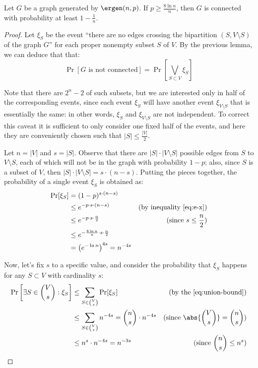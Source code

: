 \begin{theorem}[Connectivity of $G(n,p)$]\label{thm:gnp-connectivity}
    Let $G$ be a graph generated by $\ergen(n, p)$. If $p \geq \frac{8 \ln n}{n}$, then $G$ is connected with probability at least $1 - \frac{1}{n}$. %
\end{theorem}

\begin{proof}
    Let $\xi_S$ be the event ``there are no edges crossing the bipartition $(S, V \setminus S)$ of the graph $G$'' for each proper nonempty subset $S$ of $V$. By the previous lemma, we can deduce that that:
    \[
        \Pr[G \text{ is not connected}] = \Pr\left[\bigvee_{S \subset V} \xi_S\right]
    \]
    
    Note that there are $2^n - 2$ of such subsets, but we are interested only in half of the corresponding events, since each event $\xi_S$ will have another event $\xi_{V \setminus S}$ that is essentially the same: in other words,  $\xi_S$ and $\xi_{V \setminus S}$ are not independent. To correct this caveat it is sufficient to only consider one fixed half of the events, and here they are conveniently chosen such that $|S| \leq \frac{|V|}{2}$.
    
    Let $n = |V|$ and $s = |S|$. Observe that there are $|S| \cdot |V \setminus S|$ possible edges from $S$ to $V \setminus S$, each of which will not be in the graph with probability $1 - p$; also, since $S$ is a subset of $V$, then $|S| \cdot |V \setminus S| = s \cdot (n - s)$. Putting the pieces together, the probability of a single event $\xi_S$ is obtained as:
    \begin{align*}
        \Pr[\xi_S] &= (1 - p)^{s \cdot (n - s)}                 & \\
        &\leq e^{-p \cdot s \cdot (n - s)}                      & \text{(by inequality \ref{eq:e-x})} \\
        &\leq e^{-p \cdot s \cdot \frac{n}{2}}                  & \text{(since $s \leq \frac{n}{2}$)} \\
        &\leq e^{-\frac{8 \ln n}{n} \cdot s \cdot \frac{n}{2}}  & \\
        &= \left(e^{-\ln n} \right)^{4 s} = n^{-4 s}            & 
    \end{align*}
    
    Now, let's fix $s$ to a specific value, and consider the probability that $\xi_S$ happens for any $S \subset V$ with cardinality $s$:
    \begin{align*}
        \Pr\left[\exists S \in \binom{V}{s} : \xi_S\right] &\leq \sum_{S \in \binom{V}{s}} \Pr[\xi_S] & \text{(by the \ref{eq:union-bound})} \\
        &\leq \sum_{S \in \binom{V}{s}} n^{-4s} = \binom{n}{s} \cdot n^{-4s}            & \text{(since $\displaystyle \abs{\binom{V}{s}} = \binom{n}{s}$)} \\
        &\leq n^s \cdot n^{-4s} = n^{-3s}                                               & \text{(since $\displaystyle \binom{n}{s} \leq n^s)$}
    \end{align*}
    

\end{proof}
